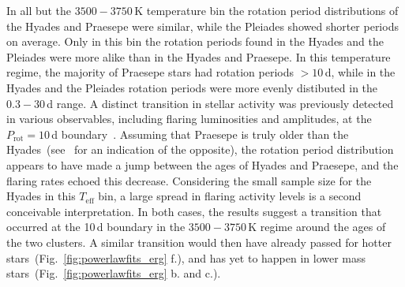\documentclass{aa}
\begin{document}
In all but the $3500-3750$\,K temperature bin the rotation period distributions of the Hyades and Praesepe were similar, while the Pleiades showed shorter periods on average. Only in this bin the rotation periods found in the Hyades and the Pleiades were more alike than in the Hyades and Praesepe. In this temperature regime, the majority of Praesepe stars had rotation periods $>10$\,d, while in the Hyades and the Pleiades rotation periods were more evenly distibuted in the $0.3-30$\,d range. A distinct transition in stellar activity was previously detected in various observables, including flaring luminosities and amplitudes, at the $P_\mathrm{rot}=10$\,d boundary~\citep{stelzer2016, lu2019}. Assuming that Praesepe is truly older than the Hyades~(see~\citet{douglas2019} for an indication of the opposite), the rotation period distribution appears to have made a jump between the ages of Hyades and Praesepe, and the flaring rates echoed this decrease. Considering the small sample size for the Hyades in this $T_\mathrm{eff}$ bin, a large spread in flaring activity levels is a second conceivable interpretation. In both cases, the results suggest a transition that occurred at the 10\,d boundary in the $3500-3750$\,K regime around the ages of the two clusters. A similar transition would then have already passed for hotter stars~(Fig.~\ref{fig:powerlawfits_erg} f.), and has yet to happen in lower mass stars~(Fig.~\ref{fig:powerlawfits_erg} b. and c.).
\end{document}
